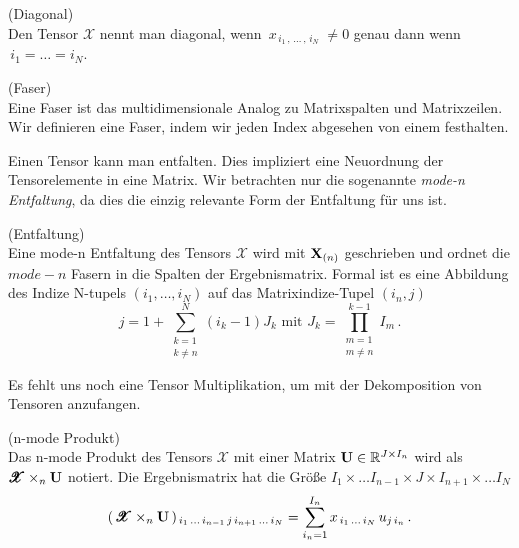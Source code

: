 \begin{Definition} (Diagonal) \\
Den Tensor $\pmb{\mathscr{X}}$ nennt man diagonal, wenn
$\, x_{ \, i_1 \,, \, \dots \, , \, i_N \, } \, \neq 0$ genau dann wenn \\ $\, i_1 = \dots = i_N$.
\end{Definition}

\begin{Definition} (Faser) \\
Eine Faser ist das multidimensionale Analog zu Matrixspalten und Matrixzeilen. Wir definieren eine Faser, indem wir jeden Index abgesehen von einem festhalten.
\end{Definition}

Einen Tensor kann man entfalten. Dies impliziert eine Neuordnung der Tensorelemente in eine Matrix.
Wir betrachten nur die sogenannte \textit{mode-n Entfaltung}, da dies die einzig relevante Form der Entfaltung für uns ist.

\begin{Bemerkung} (Entfaltung) \\
Eine mode-n Entfaltung des Tensors $\pmb{\mathscr{X}}$ wird mit $\bold{X}_{(n)}$ geschrieben und ordnet die $mode-n$ Fasern in die Spalten der Ergebnismatrix.
Formal ist es eine Abbildung des Indize N-tupels $(i_1,\dots,i_N)$ auf das Matrixindize-Tupel $(i_n,j) $
\begin{equation}
j=1+\sum_{\substack{k=1 \\ k \neq n}}^{N} (i_k-1)J_k \text{ mit } J_k = \prod_{\substack{m=1 \\ m \neq n}}^{k-1} I_m \, .
\end{equation}
\end{Bemerkung}

Es fehlt uns noch eine Tensor Multiplikation, um mit der Dekomposition von Tensoren anzufangen. 

\begin{Definition} (n-mode Produkt) \\
Das n-mode Produkt des Tensors $\pmb{\mathscr{X}}$ mit einer Matrix $\bold{U} \in \mathbb{R}^{J \times I_n}$ wird als $\pmb{\mathscr{X}} \times_n \bold{U}$ notiert. Die Ergebnismatrix hat die Größe $I_1 \times \dots I_{n-1} \times J \times I_{n+1} \times \dots I_N$
\begin{equation}
	(\, \pmb{\mathscr{X}} \times_n \bold{U} \, )_{\, i_1 \, \dots \, i_{n-1} \, j \, i_{n+1}\, \dots \, i_N} = \sum_{i_n = 1}^{I_n} x_{\, i_1 \, \dots \, i_N} \, u_{j \, i_n} \, .
\end{equation}
\end{Definition}

